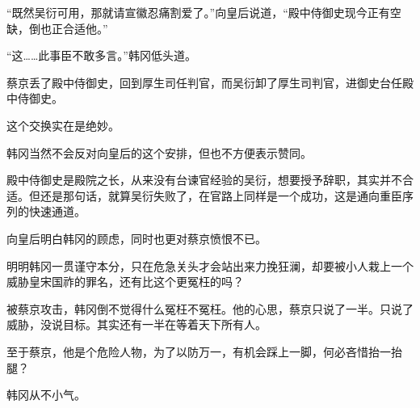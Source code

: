 “既然吴衍可用，那就请宣徽忍痛割爱了。”向皇后说道，“殿中侍御史现今正有空缺，倒也正合适他。”

“这……此事臣不敢多言。”韩冈低头道。

蔡京丢了殿中侍御史，回到厚生司任判官，而吴衍卸了厚生司判官，进御史台任殿中侍御史。

这个交换实在是绝妙。

韩冈当然不会反对向皇后的这个安排，但也不方便表示赞同。

殿中侍御史是殿院之长，从来没有台谏官经验的吴衍，想要授予辞职，其实并不合适。但还是那句话，就算吴衍失败了，在官路上同样是一个成功，这是通向重臣序列的快速通道。

向皇后明白韩冈的顾虑，同时也更对蔡京愤恨不已。

明明韩冈一贯谨守本分，只在危急关头才会站出来力挽狂澜，却要被小人栽上一个威胁皇宋国祚的罪名，还有比这个更冤枉的吗？

被蔡京攻击，韩冈倒不觉得什么冤枉不冤枉。他的心思，蔡京只说了一半。只说了威胁，没说目标。其实还有一半在等着天下所有人。

至于蔡京，他是个危险人物，为了以防万一，有机会踩上一脚，何必吝惜抬一抬腿？

韩冈从不小气。


